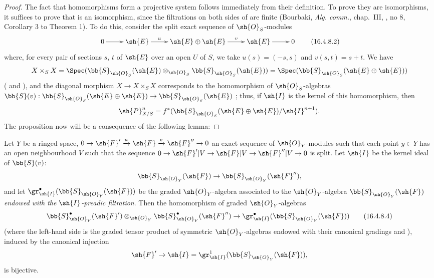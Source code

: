 \begin{proof}
The fact that homomorphisms  form a projective system follows immediately from their definition.
To prove they are isomorphisms, it suffices to 
prove that  is an isomorphism, since the filtrations on both sides of  are finite (Bourbaki, \emph{Alg. comm.}, chap.~III, , no 8, Corollary 3 to Theorem 1).
To do this, consider the split exact sequence of $\sh{O}_S$-modules
\[
  \label{IV.16.4.8.2}
  \xymatrix{
    0 \ar[r] & \sh{E} \ar[r]^-u & \sh{E} \oplus \sh{E} \ar[r]^-v & \sh{E} \ar[r] & 0
  }
  \tag{16.4.8.2}
\] 
where, for every pair of sections $s$, $t$ of $\sh{E}$ over an open $U$ of $S$, we take $u(s) = (-s, s)$ and $v(s,t) = s + t$.
We have
\[
  X \times_S X = \Spec(\bb{S}_{\sh{O}_S}(\sh{E}) \otimes_{\sh{O}_S} \bb{S}_{\sh{O}_S}(\sh{E})) = \Spec(\bb{S}_{\sh{O}_S}(\sh{E} \oplus \sh{E}))
\]
( and ), and the diagonal morphism $X \to X \times_S X$ corresponds  to the homomorphism of $\sh{O}_S$-algebras $\bb{S}(v): \bb{S}_{\sh{O}_S}(\sh{E} \oplus \sh{E}) \to \bb{S}_{\sh{O}_S}(\sh{E})$ ; thus, if $\sh{I}$ is the kernel of this homomorphism, then
\[
  \sh{P}_{X/S}^n = f^*(\bb{S}_{\sh{O}_S}(\sh{E} \oplus \sh{E})/\sh{I}^{n+1}).
\]
The proposition now will be a consequence of the following lemma:
\end{proof}

\begin{lemma}[16.4.8.3]
\label{IV.16.4.8.3}
Let $Y$ be a ringed space, $0 \to \sh{F}'  \xrightarrow{u} \sh{F} \xrightarrow{v} \sh{F}'' \to 0$ an exact sequence of $\sh{O}_Y$-modules such that each point $y \in Y$ has an open neighbourhood $V$ such that the sequence $0 \to \sh{F}'|V \to \sh{F}|V \to \sh{F}''|V \to 0$ is split.
Let $\sh{I}$ be the kernel ideal of $\bb{S}(v)$:
\[
  \bb{S}_{\sh{O}_Y}(\sh{F}) \to \bb{S}_{\sh{O}_Y}(\sh{F}''),
\]
and let $\gr_{\sh{I}}^\bullet(\bb{S}_{\sh{O}_Y}(\sh{F}))$ be the graded $\sh{O}_Y$-algebra associated to the $\sh{O}_Y$-algebra $\bb{S}_{\sh{O}_Y}(\sh{F})$ \emph{endowed with the $\sh{I}$-preadic filtration}.
Then the homomorphism of graded $\sh{O}_Y$-algebras
\[
  \label{IV.16.4.8.4}
  \bb{S}_{\sh{O}_Y}^\bullet(\sh{F}') \otimes_{\sh{O}_Y} \bb{S}_{\sh{O}_Y}^\bullet(\sh{F}'') \to \gr_{\sh{I}}^\bullet(\bb{S}_{\sh{O}_Y}(\sh{F}))
  \tag{16.4.8.4}
\]
(where the left-hand side is the graded tensor product of symmetric $\sh{O}_Y$-algebras endowed with their canonical gradings  and ), induced by the canonical injection
\[
  \sh{F}' \to \sh{I} = \gr_{\sh{I}}^1(\bb{S}_{\sh{O}_Y}(\sh{F})),
\]
is bijective.
\end{lemma}


